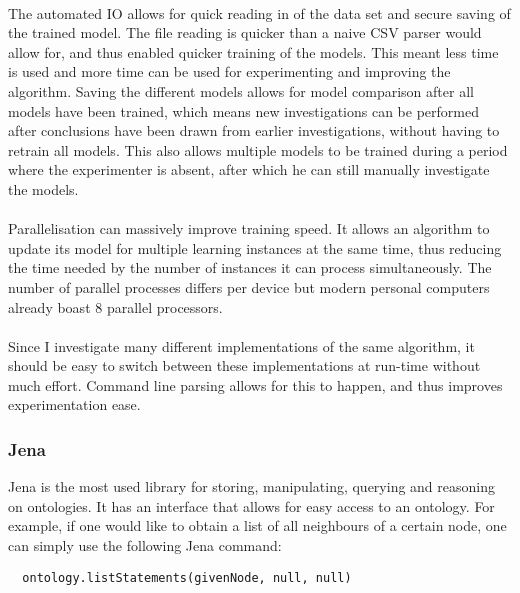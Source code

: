 \documentclass{article}
\begin{document}
 \paragraph{}
 The automated IO allows for quick reading in of the data set and secure saving of the trained model. The file reading is quicker than a naive CSV parser would allow for, and thus enabled quicker training of the models. This meant less time is used and more time can be used for experimenting and improving the algorithm. Saving the different models allows for model comparison after all models have been trained, which means new investigations can be performed after conclusions have been drawn from earlier investigations, without having to retrain all models. This also allows multiple models to be trained during a period where the experimenter is absent, after which he can still manually investigate the models.
 \paragraph{}
 Parallelisation can massively improve training speed. It allows an algorithm to update its model for multiple learning instances at the same time, thus reducing the time needed by the number of instances it can process simultaneously. The number of parallel processes differs per device but modern personal computers already boast 8 parallel processors.
 \paragraph{}
 Since I investigate many different implementations of the same algorithm, it should be easy to switch between these implementations at run-time without much effort. Command line parsing allows for this to happen, and thus improves experimentation ease.
 
 \subsubsection{Jena}
 Jena is the most used library for storing, manipulating, querying and reasoning on ontologies\cite{jena}. It has an interface that allows for easy access to an ontology. For example, if one would like to obtain a list of all neighbours of a certain node, one can simply use the following Jena command:
 
 \lstset{language=Java}
 \begin{lstlisting}
  ontology.listStatements(givenNode, null, null)
 \end{lstlisting}
 
\end{document}
